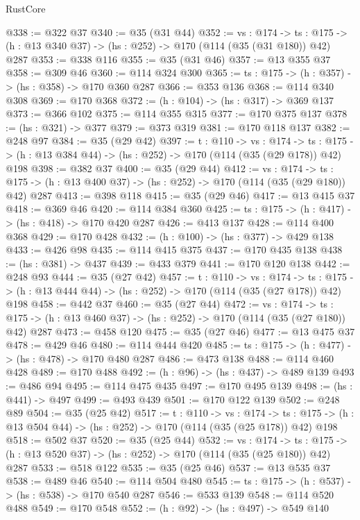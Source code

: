 \begin{lexlean}{RustCore}
\begin{coremodule}
@338 := @322 @37
@340 := @35 (@31 @44)
@352 := {vs : @174} ->
  {ts : @175} -> (h : @13 @340 @37) -> (hs : @252) -> @170 (@114 (@35 (@31 @180)) @42) @287
@353 := @338 @116
@355 := @35 (@31 @46)
@357 := @13 @355 @37
@358 := @309 @46
@360 := @114 @324 @300
@365 := {ts : @175} -> (h : @357) -> (hs : @358) -> @170 @360 @287
@366 := @353 @136
@368 := @114 @340 @308
@369 := @170 @368
@372 := (h : @104) -> (hs : @317) -> @369 @137
@373 := @366 @102
@375 := @114 @355 @315
@377 := @170 @375 @137
@378 := (hs : @321) -> @377
@379 := @373 @319
@381 := @170 @118 @137
@382 := @248 @97
@384 := @35 (@29 @42)
@397 := {t : @110} ->
  {vs : @174} ->
  {ts : @175} -> (h : @13 @384 @44) -> (hs : @252) -> @170 (@114 (@35 (@29 @178)) @42) @198
@398 := @382 @37
@400 := @35 (@29 @44)
@412 := {vs : @174} ->
  {ts : @175} -> (h : @13 @400 @37) -> (hs : @252) -> @170 (@114 (@35 (@29 @180)) @42) @287
@413 := @398 @118
@415 := @35 (@29 @46)
@417 := @13 @415 @37
@418 := @369 @46
@420 := @114 @384 @360
@425 := {ts : @175} -> (h : @417) -> (hs : @418) -> @170 @420 @287
@426 := @413 @137
@428 := @114 @400 @368
@429 := @170 @428
@432 := (h : @100) -> (hs : @377) -> @429 @138
@433 := @426 @98
@435 := @114 @415 @375
@437 := @170 @435 @138
@438 := (hs : @381) -> @437
@439 := @433 @379
@441 := @170 @120 @138
@442 := @248 @93
@444 := @35 (@27 @42)
@457 := {t : @110} ->
  {vs : @174} ->
  {ts : @175} -> (h : @13 @444 @44) -> (hs : @252) -> @170 (@114 (@35 (@27 @178)) @42) @198
@458 := @442 @37
@460 := @35 (@27 @44)
@472 := {vs : @174} ->
  {ts : @175} -> (h : @13 @460 @37) -> (hs : @252) -> @170 (@114 (@35 (@27 @180)) @42) @287
@473 := @458 @120
@475 := @35 (@27 @46)
@477 := @13 @475 @37
@478 := @429 @46
@480 := @114 @444 @420
@485 := {ts : @175} -> (h : @477) -> (hs : @478) -> @170 @480 @287
@486 := @473 @138
@488 := @114 @460 @428
@489 := @170 @488
@492 := (h : @96) -> (hs : @437) -> @489 @139
@493 := @486 @94
@495 := @114 @475 @435
@497 := @170 @495 @139
@498 := (hs : @441) -> @497
@499 := @493 @439
@501 := @170 @122 @139
@502 := @248 @89
@504 := @35 (@25 @42)
@517 := {t : @110} ->
  {vs : @174} ->
  {ts : @175} -> (h : @13 @504 @44) -> (hs : @252) -> @170 (@114 (@35 (@25 @178)) @42) @198
@518 := @502 @37
@520 := @35 (@25 @44)
@532 := {vs : @174} ->
  {ts : @175} -> (h : @13 @520 @37) -> (hs : @252) -> @170 (@114 (@35 (@25 @180)) @42) @287
@533 := @518 @122
@535 := @35 (@25 @46)
@537 := @13 @535 @37
@538 := @489 @46
@540 := @114 @504 @480
@545 := {ts : @175} -> (h : @537) -> (hs : @538) -> @170 @540 @287
@546 := @533 @139
@548 := @114 @520 @488
@549 := @170 @548
@552 := (h : @92) -> (hs : @497) -> @549 @140

\end{coremodule}
\end{lexlean}
